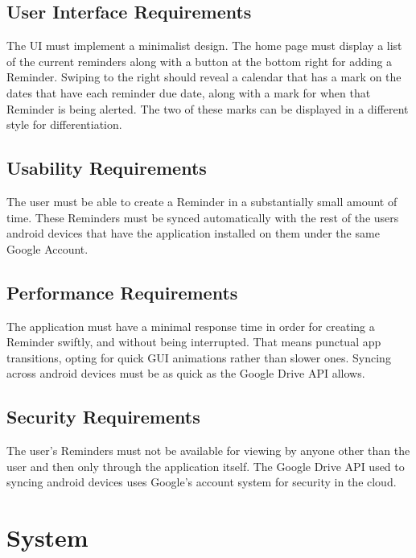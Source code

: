 \documentclass[12pt]{article}
\begin{document}
\subsection{User Interface Requirements}
The UI must implement a minimalist design. The home page must display a list of the current reminders along with a button at the bottom right for adding a Reminder. Swiping to the right should reveal a calendar that has a mark on the dates that have each reminder due date, along with a mark for when that Reminder is being alerted. The two of these marks can be displayed in a different style for differentiation. 

\subsection{Usability Requirements}
The user must be able to create a Reminder in a substantially small amount of time. These Reminders must be synced automatically with the rest of the users android devices that have the application installed on them under the same Google Account.

\subsection{Performance Requirements}
The application must have a minimal response time in order for creating a Reminder swiftly, and without being interrupted. That means punctual app transitions, opting for quick GUI animations rather than slower ones. Syncing across android devices must be as quick as the Google Drive API allows. 

\subsection{Security Requirements}
The user's Reminders must not be available for viewing by anyone other than the user and then only through the application itself.  The Google Drive API used to syncing android devices uses Google's account system for security in the cloud. 

\section{System}\label{system}
\end{document}
